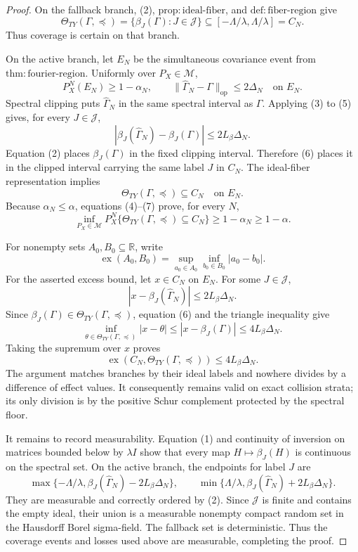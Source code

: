 \documentclass{article}
\begin{document}
\begin{proof}
On the fallback branch, (2), \(\mathrm{prop:ideal\text{-}fiber}\), and \(\mathrm{def:fiber\text{-}region}\) give
\[
 \Theta_{TY}(\Gamma,\preceq)
 =\{\beta_J(\Gamma):J\in\mathcal J\}
 \subseteq[-\Lambda/\lambda,\Lambda/\lambda]=C_N. \tag{4}
\]
Thus coverage is certain on that branch.

On the active branch, let \(E_N\) be the simultaneous covariance event from \(\mathrm{thm:fourier\text{-}region}\).  Uniformly over \(P_X\in\mathcal M\),
\[
 P_X^N(E_N)\ge1-\alpha_N,
 \qquad
 \|\widehat\Gamma_N-\Gamma\|_{\mathrm{op}}\le2\Delta_N
 \quad\text{on }E_N. \tag{5}
\]
Spectral clipping puts \(\widehat\Gamma_N\) in the same spectral interval as \(\Gamma\).  Applying (3) to (5) gives, for every \(J\in\mathcal J\),
\[
 |\beta_J(\widehat\Gamma_N)-\beta_J(\Gamma)|
 \le2L_\beta\Delta_N. \tag{6}
\]
Equation (2) places \(\beta_J(\Gamma)\) in the fixed clipping interval.  Therefore (6) places it in the clipped interval carrying the same label \(J\) in \(C_N\).  The ideal-fiber representation implies
\[
 \Theta_{TY}(\Gamma,\preceq)\subseteq C_N
 \quad\text{on }E_N. \tag{7}
\]
Because \(\alpha_N\le\alpha\), equations (4)--(7) prove, for every \(N\),
\[
 \inf_{P_X\in\mathcal M}P_X^N
 \{\Theta_{TY}(\Gamma,\preceq)\subseteq C_N\}
 \ge1-\alpha_N\ge1-\alpha. \tag{8}
\]

For nonempty sets \(A_0,B_0\subseteq\mathbb R\), write
\[
 \operatorname{ex}(A_0,B_0)
 =\sup_{a_0\in A_0}\inf_{b_0\in B_0}|a_0-b_0|.
\]
For the asserted excess bound, let \(x\in C_N\) on \(E_N\).  For some \(J\in\mathcal J\),
\[
 |x-\beta_J(\widehat\Gamma_N)|\le2L_\beta\Delta_N.
\]
Since \(\beta_J(\Gamma)\in\Theta_{TY}(\Gamma,\preceq)\), equation (6) and the triangle inequality give
\[
 \inf_{\theta\in\Theta_{TY}(\Gamma,\preceq)}|x-\theta|
 \le |x-\beta_J(\Gamma)|\le4L_\beta\Delta_N.
\]
Taking the supremum over \(x\) proves
\[
 \operatorname{ex}(C_N,\Theta_{TY}(\Gamma,\preceq))
 \le4L_\beta\Delta_N. \tag{9}
\]
The argument matches branches by their ideal labels and nowhere divides by a difference of effect values.  It consequently remains valid on exact collision strata; its only division is by the positive Schur complement protected by the spectral floor.

It remains to record measurability.  Equation (1) and continuity of inversion on matrices bounded below by \(\lambda I\) show that every map \(H\mapsto\beta_J(H)\) is continuous on the spectral set.  On the active branch, the endpoints for label \(J\) are
\[
 \max\{-\Lambda/\lambda,\beta_J(\widehat\Gamma_N)-2L_\beta\Delta_N\},
 \qquad
 \min\{\Lambda/\lambda,\beta_J(\widehat\Gamma_N)+2L_\beta\Delta_N\}.
\]
They are measurable and correctly ordered by (2).  Since \(\mathcal J\) is finite and contains the empty ideal, their union is a measurable nonempty compact random set in the Hausdorff Borel sigma-field.  The fallback set is deterministic.  Thus the coverage events and losses used above are measurable, completing the proof.
\end{proof}
\end{document}
